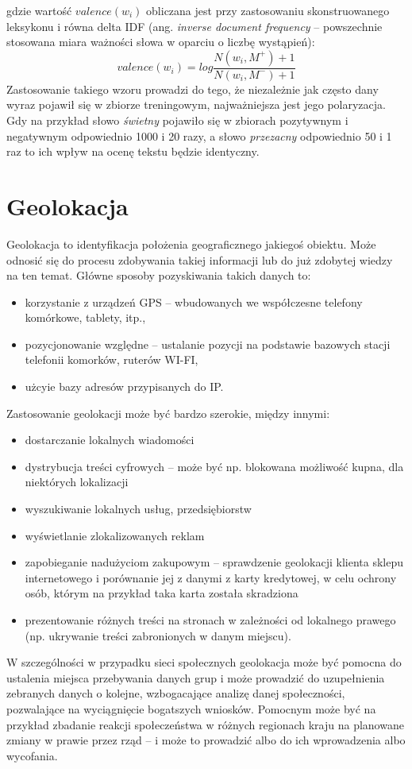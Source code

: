 gdzie wartość $valence(w_i)$ obliczana jest przy zastosowaniu skonstruowanego
leksykonu i równa delta IDF (ang. \textit{inverse document frequency} -- 
powszechnie stosowana miara ważności słowa w oparciu o liczbę wystąpień):
\begin{equation}
valence(w_i) = log\frac{N(w_i, M^+) + 1}{N(w_i, M^-) + 1}
\end{equation} 
Zastosowanie takiego wzoru prowadzi do tego, że niezależnie jak często
dany wyraz pojawił się w zbiorze treningowym, najważniejsza jest jego polaryzacja.
Gdy na przykład słowo \textit{świetny} pojawiło się w zbiorach pozytywnym
i negatywnym odpowiednio 1000 i 20 razy, a słowo \textit{przezacny} odpowiednio
50 i 1 raz to ich wpływ na ocenę tekstu będzie identyczny.






\clearpage\section{Geolokacja}
Geolokacja to identyfikacja położenia geograficznego jakiegoś obiektu.
Może odnosić się do procesu zdobywania takiej informacji lub do już zdobytej
wiedzy na ten temat. Główne sposoby pozyskiwania takich danych to:
\begin{itemize}
  \item korzystanie z urządzeń GPS -- wbudowanych we współczesne telefony
komórkowe, tablety, itp.,
  \item pozycjonowanie względne -- ustalanie pozycji na podstawie bazowych stacji
telefonii komorków, ruterów WI-FI,
\item użcyie bazy adresów przypisanych do IP.
\end{itemize} 
Zastosowanie geolokacji może być bardzo szerokie, między innymi:
\begin{itemize}
  \item dostarczanie lokalnych wiadomości
  \item dystrybucja treści cyfrowych -- może być np. blokowana możliwość kupna, 
  dla niektórych lokalizacji
  \item wyszukiwanie lokalnych usług, przedsiębiorstw
  \item wyświetlanie zlokalizowanych reklam
  \item zapobieganie nadużyciom zakupowym -- sprawdzenie geolokacji
  klienta sklepu internetowego i porównanie jej z danymi z karty kredytowej,
  w celu ochrony osób, którym na przykład taka karta została skradziona
  \item prezentowanie różnych treści na stronach w zależności od lokalnego
  prawego (np. ukrywanie treści zabronionych w danym miejscu).
\end{itemize}
W szczególności w przypadku sieci społecznych geolokacja może być pomocna do
ustalenia miejsca przebywania danych grup i może prowadzić
do uzupełnienia zebranych danych o kolejne, wzbogacające analizę danej społeczności,
pozwalające na wyciągnięcie bogatszych wniosków. Pomocnym może być na przykład
zbadanie reakcji społeczeństwa w różnych regionach kraju na planowane zmiany
w prawie przez rząd -- i może to prowadzić albo do ich wprowadzenia albo wycofania.

